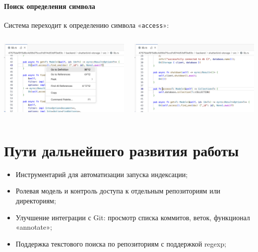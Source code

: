 \documentclass[aspectratio=169,professionalfonts,10pt]{beamer}
\begin{document}
\begin{frame}[t]{\insertsection}
\framesubtitle{Поиск определения символа}

Система переходит к определению символа «\texttt{access}»:

\begin{columns}
    \begin{column}{0.5\textwidth}
        \includegraphics[width=\linewidth,keepaspectratio]{figures/demo-goto-1.png}
    \end{column}
    \begin{column}{0.5\textwidth}
        \includegraphics[width=\linewidth,keepaspectratio]{figures/demo-goto-2.png}
    \end{column}
\end{columns}

\end{frame}

\section{Пути дальнейшего развития работы}
\begin{frame}{\insertsection}
    \begin{itemize}
        \item Инструментарий для автоматизации запуска индексации;
        \item Ролевая модель и контроль доступа к отдельным репозиториям или директориям;
        \item Улучшение интеграции с Git: просмотр списка коммитов, веток, функционал «annotate»;
        \item Поддержка текстового поиска по репозиториям с поддержкой regexp;
    \end{itemize}
\end{frame}
\end{document}
